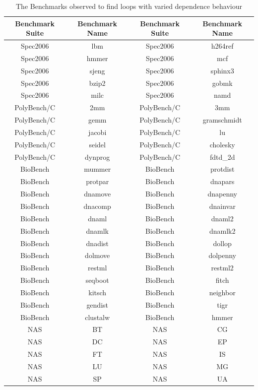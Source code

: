 \documentclass[10pt]{report}          %
\begin{document}
\begin{table}
\centering
\caption{The Benchmarks observed to find loops with varied dependence behaviour }
\begin{tabular}{|c|c||c|c|} \hline
Benchmark Suite & Benchmark Name & Benchmark Suite & Benchmark Name \\ \hline 
Spec2006 & lbm & Spec2006 & h264ref \\ \hline
Spec2006 & hmmer & Spec2006 & mcf \\ \hline
Spec2006 & sjeng & Spec2006 & sphinx3  \\ \hline
Spec2006 & bzip2   & Spec2006 & gobmk  \\ \hline
Spec2006 & milc  & Spec2006 & namd   \\ \hline
PolyBench/C & 2mm	 &PolyBench/C & 3mm \\ \hline
PolyBench/C & gemm& PolyBench/C & gramschmidt\\ \hline
PolyBench/C & jacobi &PolyBench/C & lu	 \\ \hline
PolyBench/C & seidel &PolyBench/C & cholesky \\ \hline
PolyBench/C & dynprog &PolyBench/C & fdtd\_2d  \\ \hline
BioBench & mummer  &BioBench & protdist  \\ \hline
BioBench & protpar  &BioBench & dnapars  \\ \hline
BioBench & dnamove  &BioBench & dnapenny  \\ \hline
BioBench & dnacomp  &BioBench & dnainvar  \\ \hline
BioBench & dnaml  &BioBench & dnaml2  \\ \hline
BioBench & dnamlk  &BioBench & dnamlk2  \\ \hline
BioBench & dnadist  &BioBench & dollop  \\ \hline
BioBench & dolmove  &BioBench & dolpenny  \\ \hline
BioBench & restml  &BioBench & restml2  \\ \hline
BioBench & seqboot  &BioBench & fitch  \\ \hline
BioBench & kitsch  &BioBench & neighbor  \\ \hline
BioBench & gendist &BioBench & tigr  \\ \hline
BioBench & clustalw &BioBench & hmmer  \\ \hline
NAS & BT & NAS & CG  \\ \hline
NAS & DC & NAS & EP  \\ \hline
NAS & FT & NAS & IS  \\ \hline
NAS & LU & NAS & MG  \\ \hline
NAS & SP & NAS & UA  \\ \hline
\hline\end{tabular}
\label{table:benchmarks_observed}
\end{table}
\end{document}

